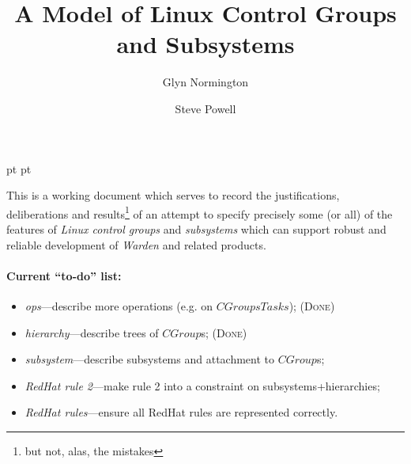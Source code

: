 \documentclass[a4paper,twoside,12pt]{article}
\begin{document}
 pt
 pt

\def\Slash{\slash\hspace{0pt}}

\title{A Model of Linux Control Groups and Subsystems}

\author{
Glyn Normington\and
Steve Powell
}

\maketitle
\thispagestyle{myheadings}
\setcounter{page}{1}


This is a working document which serves to record the justifications, deliberations and results\footnote{but 
not, alas, the mistakes} of an attempt to
specify precisely some (or all) of the features of \emph{Linux control groups} and \emph{subsystems} which can support robust and reliable development of \emph{Warden} and related products.

\paragraph{Current ``to-do'' list:}
\begin{itemize}
\item \emph{ops}---describe more operations (e.g. on $CGroupsTasks$); (\textsc{Done})
\item \emph{hierarchy}---describe trees of $CGroup$s; (\textsc{Done})
\item \emph{subsystem}---describe subsystems and attachment to $CGroup$s;
\item \emph{RedHat rule 2}---make rule 2 into a constraint on subsystems+hierarchies;
\item \emph{RedHat rules}---ensure all RedHat rules are represented correctly.
\end{itemize}


\newcommand{\true}{true}
\newcommand{\false}{false}
\renewcommand{\emptyset}{\varnothing}
\end{document}
